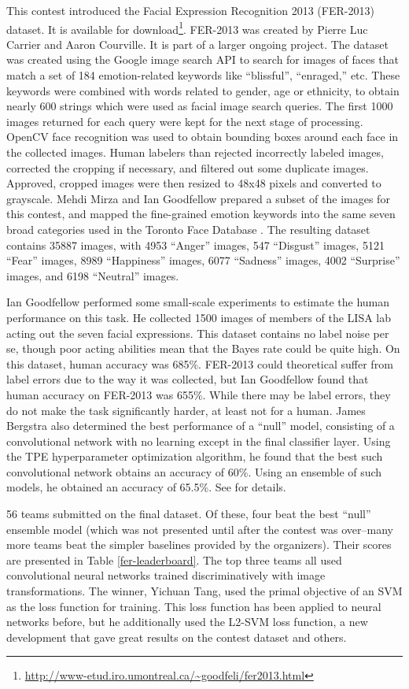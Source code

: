 \documentclass{llncs}
\begin{document}
This contest introduced the Facial Expression Recognition 2013 (FER-2013) dataset.
It is available for download\footnote{\tiny{\url{http://www-etud.iro.umontreal.ca/~goodfeli/fer2013.html}}}.
FER-2013 was created by Pierre Luc Carrier and Aaron Courville. It is part of a larger ongoing project.
The dataset was created using the Google image search API to search for
images of faces that match a set of 184 emotion-related keywords like ``blissful'', ``enraged,'' etc.
These keywords were combined with words related to gender, age or ethnicity,
to obtain nearly 600 strings which were used as facial image search queries. The first 1000 images returned for
each query were kept for the next stage of processing. 
OpenCV face recognition was used to obtain bounding boxes around each face in
the collected images.
Human labelers than rejected incorrectly labeled images, corrected the cropping if necessary, and filtered out some duplicate images.
Approved, cropped images were then resized to 48x48 pixels and converted to grayscale. Mehdi Mirza and Ian Goodfellow prepared
a subset of the images for this contest, and mapped the fine-grained emotion keywords into the same seven broad categories
used in the Toronto Face Database \citep{Susskind2010}. The resulting dataset contains 35887 images, with 4953 ``Anger'' images,
547 ``Disgust'' images, 5121 ``Fear'' images, 8989 ``Happiness'' images, 6077 ``Sadness'' images, 4002 ``Surprise'' images, and
6198 ``Neutral'' images.


Ian Goodfellow
performed some small-scale experiments to estimate the human performance on this task.
He collected 1500 images of members of the LISA lab acting out the seven facial expressions.
This dataset contains no label noise per se, though poor acting abilities mean that the Bayes
rate could be quite high. On this dataset, human accuracy was 685\%. FER-2013 could
theoretical suffer from label errors due to the way it was collected, but Ian Goodfellow found
that human accuracy on FER-2013 was 655\%. While there may be label errors, they do
not make the task significantly harder, at least not for a human. James Bergstra also determined
the best performance of a ``null'' model, consisting of a convolutional network with no learning
except in the final classifier layer. Using the TPE hyperparameter optimization algorithm, he found
that the best such convolutional network obtains an accuracy of 60\%. Using an ensemble of such models,
he obtained an accuracy of 65.5\%. See \citep{Bergstra-wkshp-2013} for details.

56 teams submitted on the final dataset. Of these, four beat the best ``null'' ensemble model (which was not presented
until after the contest was over--many more teams beat the simpler baselines provided by the organizers).
Their scores are presented in Table \ref{fer-leaderboard}. The top three teams all used convolutional neural networks \citep{Fukushima80}
trained discriminatively with image transformations. The winner, Yichuan Tang, used the primal objective of an SVM
as the loss function for training. This loss function has been applied to neural networks before, but he additionally used the L2-SVM
loss function, a new development that gave great results on the contest dataset and others.
\end{document}
